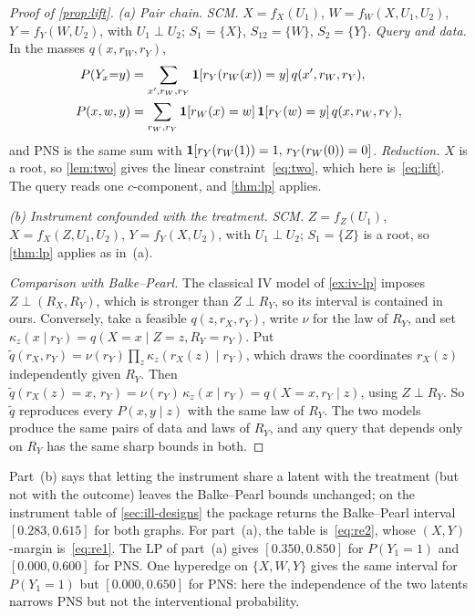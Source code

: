 \begin{proof}[Proof of \cref{prop:lift}]
\emph{(a) Pair chain.}
\textit{SCM.} $X=f_X(U_1)$, $W=f_W(X,U_1,U_2)$, $Y=f_Y(W,U_2)$, with
$U_1\perp U_2$; $S_1=\{X\}$, $S_{12}=\{W\}$, $S_2=\{Y\}$.
\textit{Query and data.} In the masses $q(x,r_W,r_Y)$,
\begin{align*}
P(Y_x{=}y)&=\sum_{x',r_W,r_Y}\mathbf{1}[r_Y(r_W(x))=y]\,q(x',r_W,r_Y),\\
P(x,w,y)&=\sum_{r_W,r_Y}\mathbf{1}[r_W(x)=w]\,\mathbf{1}[r_Y(w)=y]\,q(x,r_W,r_Y),
\end{align*}
and PNS is the same sum with $\mathbf{1}[r_Y(r_W(1))=1,\,r_Y(r_W(0))=0]$.
\textit{Reduction.} $X$ is a root, so \cref{lem:two} gives the linear
constraint~\eqref{eq:two}, which here is~\eqref{eq:lift}. The query reads one
$c$-component, and \cref{thm:lp} applies.

\emph{(b) Instrument confounded with the treatment.}
\textit{SCM.} $Z=f_Z(U_1)$, $X=f_X(Z,U_1,U_2)$, $Y=f_Y(X,U_2)$, with
$U_1\perp U_2$; $S_1=\{Z\}$ is a root, so \cref{thm:lp} applies as in~(a).

\textit{Comparison with Balke--Pearl.} The classical IV model of
\cref{ex:iv-lp} imposes $Z\perp(R_X,R_Y)$, which is stronger than
$Z\perp R_Y$, so its interval is contained in ours. Conversely, take a
feasible $q(z,r_X,r_Y)$, write $\nu$ for the law of $R_Y$, and set
$\kappa_z(x\mid r_Y)=q(X{=}x\mid Z{=}z,R_Y{=}r_Y)$. Put
$\tilde q(r_X,r_Y)=\nu(r_Y)\prod_z\kappa_z(r_X(z)\mid r_Y)$, which draws the
coordinates $r_X(z)$ independently given $R_Y$. Then
$\tilde q(r_X(z){=}x,\,r_Y)=\nu(r_Y)\,\kappa_z(x\mid r_Y)=q(X{=}x,r_Y\mid z)$,
using $Z\perp R_Y$. So $\tilde q$ reproduces every $P(x,y\mid z)$ with the same law
of $R_Y$. The two models produce the same pairs of data and laws of $R_Y$, and
any query that depends only on $R_Y$ has the same sharp bounds in both.
\end{proof}

Part~(b) says that letting the instrument share a latent with the
treatment (but not with the outcome) leaves the Balke--Pearl bounds
unchanged; on the instrument table of \cref{sec:ill-designs} the package
returns the Balke--Pearl interval $[0.283,0.615]$ for both graphs. For
part~(a), the table is~\eqref{eq:re2}, whose $(X,Y)$-margin is~\eqref{eq:re1}. The LP of part~(a)
gives $[0.350,0.850]$ for $P(Y_1{=}1)$ and $[0.000,0.600]$ for PNS. One
hyperedge on $\{X,W,Y\}$ gives the same interval for $P(Y_1{=}1)$ but
$[0.000,0.650]$ for PNS: here the independence of the two latents narrows
PNS but not the interventional probability.

